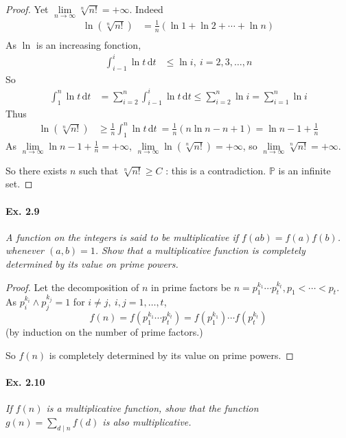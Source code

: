 \documentclass[11pt,a4paper]{article}
\newcommand{\D}{\mathrm{d}}
\begin{document}
{\begin{proof}
Yet  $\lim\limits_{n\to \infty} \sqrt[n]{n!}  = + \infty$. Indeed
\begin{align*}
\ln(\sqrt[n]{n!}) &= \frac{1}{n}(\ln 1 + \ln 2 + \cdots + \ln n)\\
\end{align*}
As $\ln$ is an increasing fonction, 
\begin{align*}
\int_{i-1}^i \ln t\, \D t &\leq \ln i, \ i=2,3,\ldots,n
\end{align*}
So
\begin{align*}
\int_1^n \ln t \, \D t &= \sum_{i=2}^n \int_{i-1}^i \ln t \, \D t \leq \sum_{i=2}^n \ln i =  \sum_{i=1}^n \ln i
\end{align*}
Thus
\begin{align*}
\ln(\sqrt[n]{n!}) &\geq  \frac{1}{n} \int_1^n \ln t\,  \D t\ = \frac{1}{n}(n \ln n - n +1) = \ln n - 1 + \frac{1}{n}
\end{align*}
As $\lim\limits_{n\to \infty}  \ln n - 1 + \frac{1}{n} = + \infty$, $\lim\limits_{n\to \infty} \ln(\sqrt[n]{n!}) = + \infty$, so $\lim\limits_{n\to \infty} \sqrt[n]{n!} = + \infty$.

So there exists $n$ such that $\sqrt[n]{n!} \geq C$ : this is a contradiction. $\mathbb{P}$ is an infinite set.
\end{proof}

\paragraph{Ex. 2.9}

{\it A function on the integers is said to be multiplicative if $f(ab) =f(a)f(b)$. whenever $(a, b) = 1$. Show that a multiplicative function is completely determined by its value on prime powers.
}

\begin{proof}
Let the decomposition of $n$ in prime factors be $n =p_1^{k_1}\cdots p_t^{k_t}, p_1< \cdots<p_t$. As $p_i^{k_i} \wedge p_j^{k_j}=1$ for $i\ne j,\ i,j = 1,\ldots,t$,
$$f(n) =f(p_1^{k_1}\cdots p_t^{k_t})=f(p_1^{k_1})\cdots f(p_t^{k_t})$$
(by induction on the number of prime factors.)

So $f(n)$ is completely determined by its value on prime powers.
\end{proof}

\paragraph{Ex. 2.10}

{\it If $f(n)$ is a multiplicative function, show that the function $g(n) = \sum_{d \mid n} f(d)$ is also multiplicative.
}

}
\end{document}
